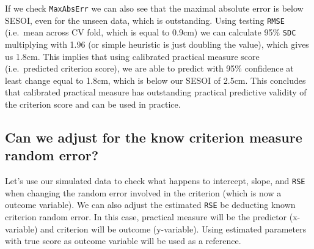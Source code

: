 \documentclass[
]{book}
\begin{document}
If we check \texttt{MaxAbsErr} we can also see that the maximal absolute error is below SESOI, even for the unseen data, which is outstanding. Using testing \texttt{RMSE} (i.e.~mean across CV fold, which is equal to 0.9cm) we can calculate 95\% \texttt{SDC} multiplying with 1.96 (or simple heuristic is just doubling the value), which gives us 1.8cm. This implies that using calibrated practical measure score (i.e.~predicted criterion score), we are able to predict with 95\% confidence at least change equal to 1.8cm, which is below our SESOI of 2.5cm. This concludes that calibrated practical measure has outstanding practical predictive validity of the criterion score and can be used in practice.

\hypertarget{can-we-adjust-for-the-know-criterion-measure-random-error}{%
\subsection{Can we adjust for the know criterion measure random error?}\label{can-we-adjust-for-the-know-criterion-measure-random-error}}

Let's use our simulated data to check what happens to intercept, slope, and \texttt{RSE} when changing the random error involved in the criterion (which is now a outcome variable). We can also adjust the estimated \texttt{RSE} be deducting known criterion random error. In this case, practical measure will be the predictor (x-variable) and criterion will be outcome (y-variable). Using estimated parameters with true score as outcome variable will be used as a reference.
\end{document}
